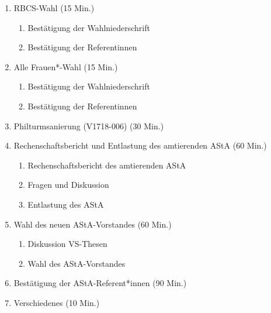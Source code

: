 \documentclass[ngerman,headheight=70pt]{scrartcl}
\begin{document}
\begin{enumerate}[label={\textbf{Top \theenumi}},leftmargin=*]
        \item RBCS-Wahl (15 Min.)
            \begin{enumerate}
                \item Bestätigung der Wahlniederschrift
                \item Bestätigung der Referentinnen
            \end{enumerate}
        \item Alle Frauen*-Wahl (15 Min.)
            \begin{enumerate}
                \item Bestätigung der Wahlniederschrift
                \item Bestätigung der Referentinnen
            \end{enumerate}
        \item Philturmsanierung (V1718-006) (30 Min.)
        \item Rechenschaftsbericht und Entlastung des amtierenden AStA (60 Min.)
            \begin{enumerate}
                \item Rechenschaftsbericht des amtierenden AStA
                \item Fragen und Diskussion
                \item Entlastung des AStA
              \end{enumerate}
        \item Wahl des neuen AStA-Vorstandes (60 Min.)
            \begin{enumerate}
                \item Diskussion VS-Thesen
                \item Wahl des AStA-Vorstandes
            \end{enumerate}
        \item Bestätigung der AStA-Referent*innen (90 Min.)
        \item Verschiedenes (10 Min.)
    \end{enumerate}
\end{document}
